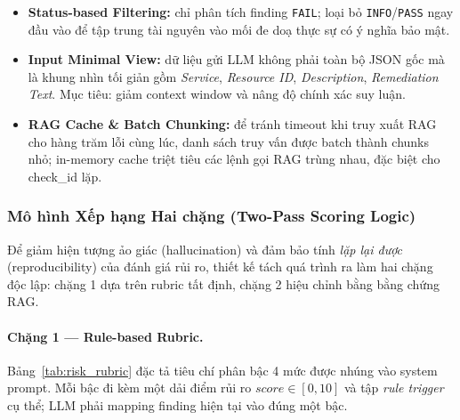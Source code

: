\begin{itemize}
  \item \textbf{Status-based Filtering:} chỉ phân tích finding \texttt{FAIL}; loại bỏ \texttt{INFO}/\texttt{PASS} ngay đầu vào để tập trung tài nguyên vào mối đe doạ thực sự có ý nghĩa bảo mật.
  \item \textbf{Input Minimal View:} dữ liệu gửi LLM không phải toàn bộ JSON gốc mà là khung nhìn tối giản gồm \textit{Service}, \textit{Resource ID}, \textit{Description}, \textit{Remediation Text}. Mục tiêu: giảm context window và nâng độ chính xác suy luận.
  \item \textbf{RAG Cache \& Batch Chunking:} để tránh timeout khi truy xuất RAG cho hàng trăm lỗi cùng lúc, danh sách truy vấn được batch thành chunks nhỏ; in-memory cache triệt tiêu các lệnh gọi RAG trùng nhau, đặc biệt cho check\_id lặp.
\end{itemize}

\subsubsection*{Mô hình Xếp hạng Hai chặng (Two-Pass Scoring Logic)}
Để giảm hiện tượng ảo giác (hallucination) và đảm bảo tính \textit{lặp lại được} (reproducibility) của đánh giá rủi ro, thiết kế tách quá trình ra làm hai chặng độc lập: chặng 1 dựa trên rubric tất định, chặng 2 hiệu chỉnh bằng bằng chứng RAG.

\paragraph*{Chặng 1 — Rule-based Rubric.} Bảng~\ref{tab:risk_rubric} đặc tả tiêu chí phân bậc 4 mức được nhúng vào system prompt. Mỗi bậc đi kèm một dải điểm rủi ro $score \in [0,10]$ và tập \textit{rule trigger} cụ thể; LLM phải mapping finding hiện tại vào đúng một bậc.


